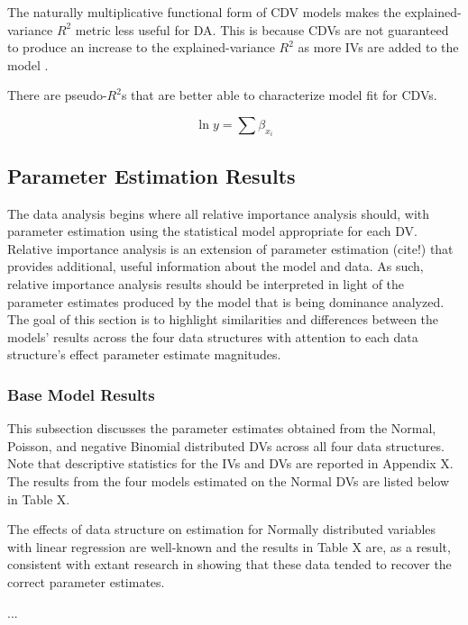 \documentclass[ShortAfour,times,sageapa]{sagej}
\begin{document}
	The naturally multiplicative functional form of CDV models makes the explained-variance $R^2$ metric less useful for DA.  This is because CDVs are not guaranteed to produce an increase to the explained-variance $R^2$ as more IVs are added to the model \cite{}.  
	
	There are pseudo-$R^2$s that are better able to characterize model fit for CDVs.  
	
	
	\begin{equation}
		\ln{y} = \sum{\beta_{x_i}}
	\end{equation}

	\subsection{Parameter Estimation Results}

The data analysis begins where all relative importance analysis should, with parameter estimation using the statistical model appropriate for each DV.  
Relative importance analysis is an extension of parameter estimation (cite!) that provides additional, useful information about the model and data.  
As such, relative importance analysis results should be interpreted in light of the parameter estimates produced by the model that is being dominance analyzed.  
The goal of this section is to highlight similarities and differences between the models' results across the four data structures with attention to each data structure's effect parameter estimate magnitudes. 

\subsubsection{Base Model Results}

This subsection discusses the parameter estimates obtained from the Normal, Poisson, and negative Binomial distributed DVs across all four data structures.  
Note that descriptive statistics for the IVs and DVs are reported in Appendix X.  The results from the four models estimated on the Normal DVs are listed below in Table X.



The effects of data structure on estimation for Normally distributed variables with linear regression are well-known and the results in Table X are, as a result, consistent with extant research in showing that these data tended to recover the correct parameter estimates.

...
\end{document}
